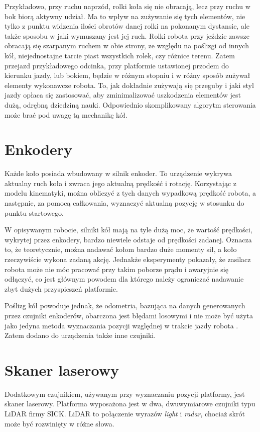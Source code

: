 		Przykładowo, przy ruchu naprzód, rolki koła się nie obracają, lecz przy ruchu w bok biorą aktywny udział.
		Ma to wpływ na zużywanie się tych elementów, nie tylko z punktu widzenia ilości obrotów danej rolki na pokonanym dystansie, 
		ale także sposobu w jaki wymuszany jest jej ruch.
		Rolki robota przy jeździe zawsze obracają się szarpanym ruchem w obie strony, ze względu na poślizgi od innych kół, 
		niejednostajne tarcie piast wszystkich rolek, czy różnice terenu. 
		Zatem przejazd przykładowego odcinka, przy platformie ustawionej przodem do kierunku jazdy, lub bokiem, będzie w różnym stopniu i w różny sposób zużywał elementy wykonawcze robota.
		To, jak dokładnie zużywają się przeguby i jaki styl jazdy opłaca się zastosować, aby zminimalizować uszkodzenia elementów jest dużą, odrębną dziedziną nauki.
		Odpowiednio skomplikowany algorytm sterowania może brać pod uwagę tą mechanikę kół.

\section{Enkodery}
	Każde koło posiada wbudowany w silnik enkoder. To urządzenie wykrywa aktualny ruch koła i zwraca jego aktualną prędkość i rotację.
	Korzystając z modelu kinematyki, można obliczyć z tych danych wypadkową prędkość robota, a następnie, za pomocą całkowania, wyznaczyć aktualną
	pozycję w stosunku do punktu startowego.
	
	W opisywanym robocie, silniki kół mają na tyle dużą moc, że wartość prędkości, wykrytej przez enkodery, bardzo niewiele odstaje od prędkości zadanej.
	Oznacza to, że teoretycznie, można nadawać kołom bardzo duże momenty sił, a koło rzeczywiście wykona zadaną akcję.
	Jednakże eksperymenty pokazały, że zasilacz robota może nie móc pracować przy takim poborze prądu i awaryjnie się odłączyć, co jest głównym powodem dla którego 
	należy ograniczać nadawanie zbyt dużych przyspieszeń platformie.

	Poślizg kół powoduje jednak, że odometria, bazująca na danych generowanych przez czujniki enkoderów, obarczona jest błędami losowymi i nie może być 
	użyta jako jedyna metoda wyznaczania pozycji względnej w trakcie jazdy robota \cite{heavy}. Zatem dodano do urządzenia także inne czujniki.
	
\section{Skaner laserowy}
	\label{sec:lidar}
	Dodatkowym czujnikiem, używanym przy wyznaczaniu pozycji platformy, jest skaner laserowy.
	Platforma wyposażona jest w dwa, dwuwymiarowe czujniki typu LiDAR firmy SICK.
	LiDAR to połączenie wyrazów \emph{light} i \emph{radar}, chociaż skrót może być rozwinięty w różne słowa.

